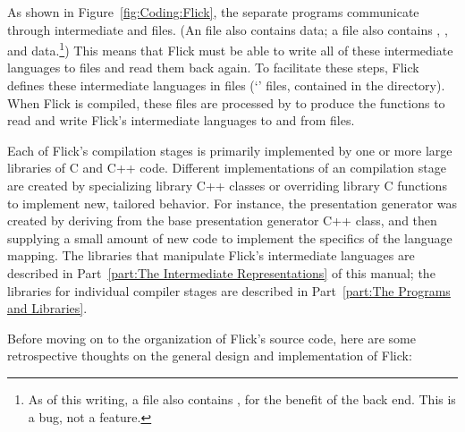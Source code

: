 
As shown in Figure~\ref{fig:Coding:Flick}, the separate programs communicate
through intermediate \AOI{} and \PRESC{} files.  (An \AOI{} file also contains
\META{} data; a \PRESC{} file also contains \META{}, \MINT{}, and \CAST{}
data.\footnote{As of this writing, a \PRESC{} file also contains \AOI{}, for
the benefit of the \ONCTCP{} back end.  This is a bug, not a feature.})  This
means that Flick must be able to write all of these intermediate languages to
files and read them back again.  To facilitate these steps, Flick defines these
intermediate languages in \ONCRPC{} \IDL{} files (`' files,
contained in the  directory).  When Flick is compiled, these
files are processed by \rpcgen{} to produce the functions to read and write
Flick's intermediate languages to and from files.

Each of Flick's compilation stages is primarily implemented by one or more
large libraries of C and C++ code.  Different implementations of an \IDL{}
compilation stage are created by specializing library C++ classes or overriding
library C functions to implement new, tailored behavior.  For instance, the
\ONCRPC{} presentation generator was created by deriving from the base
presentation generator C++ class, and then supplying a small amount of new code
to implement the specifics of the \ONCRPC{} language mapping.  The libraries
that manipulate Flick's intermediate languages are described in
Part~\ref{part:The Intermediate Representations} of this manual; the libraries
for individual compiler stages are described in Part~\ref{part:The Programs and
Libraries}.

Before moving on to the organization of Flick's source code, here are some
retrospective thoughts on the general design and implementation of Flick:

